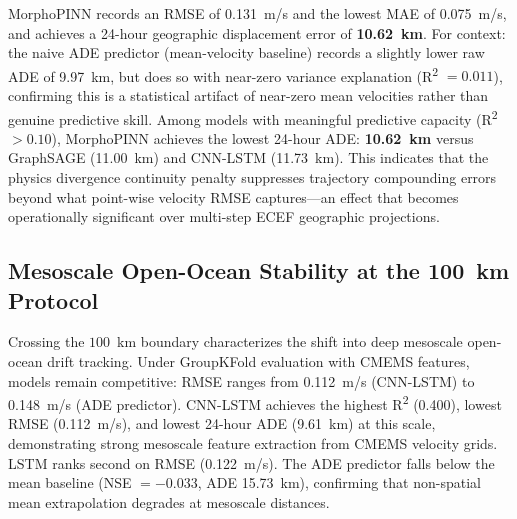 \documentclass[conference]{IEEEtran}
\begin{document}
MorphoPINN records an RMSE of 0.131~m/s and the lowest MAE of 0.075~m/s, and achieves a 24-hour geographic displacement error of \textbf{10.62~km}. For context: the naive ADE predictor (mean-velocity baseline) records a slightly lower raw ADE of 9.97~km, but does so with near-zero variance explanation (R\textsuperscript{2} $= 0.011$), confirming this is a statistical artifact of near-zero mean velocities rather than genuine predictive skill. Among models with meaningful predictive capacity (R\textsuperscript{2} $> 0.10$), MorphoPINN achieves the lowest 24-hour ADE: \textbf{10.62~km} versus GraphSAGE (11.00~km) and CNN-LSTM (11.73~km). This indicates that the physics divergence continuity penalty suppresses trajectory compounding errors beyond what point-wise velocity RMSE captures---an effect that becomes operationally significant over multi-step ECEF geographic projections.

\subsection{Mesoscale Open-Ocean Stability at the 100~km Protocol}

\begin{table}[h!]
\caption{Trajectory Divergence at the 100~km Protocol Boundary}
\label{tab:100km}
\begin{center}
\end{center}
\end{table}

Crossing the $100$~km boundary characterizes the shift into deep mesoscale open-ocean drift tracking. Under GroupKFold evaluation with CMEMS features, models remain competitive: RMSE ranges from 0.112~m/s (CNN-LSTM) to 0.148~m/s (ADE predictor). CNN-LSTM achieves the highest R\textsuperscript{2} (0.400), lowest RMSE (0.112~m/s), and lowest 24-hour ADE (9.61~km) at this scale, demonstrating strong mesoscale feature extraction from CMEMS velocity grids. LSTM ranks second on RMSE (0.122~m/s). The ADE predictor falls below the mean baseline (NSE $= -0.033$, ADE 15.73~km), confirming that non-spatial mean extrapolation degrades at mesoscale distances.
\end{document}
